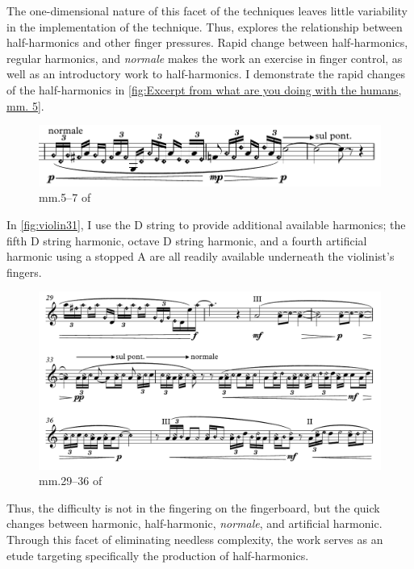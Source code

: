 The one-dimensional nature of this facet of the techniques leaves little variability in the implementation of the technique. 
Thus, \violinPiece\space explores the relationship between half-harmonics and other finger pressures. 
Rapid change between half-harmonics, regular harmonics, and \emph{normale} makes the work an exercise in finger control, as well as an introductory work to half-harmonics.
I demonstrate the rapid changes of the half-harmonics in \autoref{fig:Excerpt from what are you doing with the humans, mm. 5}.

\begin{figure}
    \includegraphics[width=\linewidth]{./resources/violinHalfHarmonicsExcerpt5.pdf}
    \caption{mm.\@ 5--7 of \violinPiece}\label{fig:Excerpt from what are you doing with the humans, mm. 5}
  \end{figure}

In \autoref{fig:violin31}, I use the D string to provide additional available harmonics; the fifth D string harmonic, octave D string harmonic, and a fourth artificial harmonic using a stopped A are all readily available underneath the violinist's fingers.
\begin{figure}
  \includegraphics[width=\linewidth]{./resources/violinHalfHarmonicsExcerpt31.pdf}
  \caption{mm.\@ 29--36 of \violinPiece}\label{fig:violin31}
\end{figure}

Thus, the difficulty is not in the fingering on the fingerboard, but the quick changes between harmonic, half-harmonic, \emph{normale}, and artificial harmonic.
Through this facet of eliminating needless complexity, the work serves as an etude targeting specifically the production of half-harmonics.

